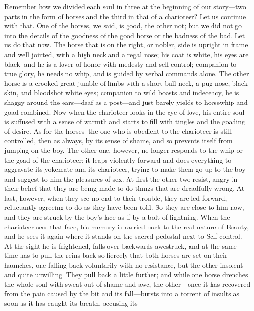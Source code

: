 Remember how we divided each soul in three at the beginning of our 
story---two parts in the form of horses and the third in that of
a charioteer? Let us continue with that. One of the horses, we said, is
good, the other not; but we did not go into the details of the goodness
of the good horse or the badness of the bad. Let us do that now. The
horse that is on the right, or nobler, side is upright in frame and well
jointed, with a high neck and a regal nose; his coat is white, his eyes
are black, and he is a lover of honor with modesty and self-control;
companion to true glory, he needs no whip, and is guided by verbal
commands alone. The other horse is a crooked great jumble of
limbs with a short bull-neck, a pug nose, black skin, and bloodshot
white eyes; companion to wild boasts and indecency, he is shaggy around
the ears---deaf as a post---and just barely yields to horsewhip and goad
combined. Now when the charioteer looks in the eye of love, his entire
soul is suffused with a sense of warmth and starts to fill with tingles
and the goading of desire. As for the horses, the one who is obedient to
the charioteer is still controlled, then as always, by its sense 
of shame, and so prevents itself from jumping on the
boy. The other one, however, no longer responds to the whip or the goad
of the charioteer; it leaps violently forward and does everything to
aggravate its yokemate and its charioteer, trying to make them go up to
the boy and suggest to him the pleasures of sex. At first the other two
resist, angry in their belief that they are being made to do
things that are dreadfully wrong. At last, however, when they see no end
to their trouble, they are led forward, reluctantly agreeing to do as
they have been told. So they are close to him now, and they are struck
by the boy’s face as if by a bolt of lightning. When the charioteer sees
that face, his memory is carried back to the real nature of Beauty, and
he sees it again where it stands on the sacred pedestal next to
Self-control. At the sight he is frightened, falls over backwards
awestruck, and at the same time has to pull the reins back so fiercely
that both horses are set on their haunches, one falling back
voluntarily with no resistance, but the other insolent and quite
unwilling. They pull back a little further; and while one horse drenches
the whole soul with sweat out of shame and awe, the other---once it has
recovered from the pain caused by the bit and its fall---bursts into a
torrent of insults as soon as it has caught its breath, accusing its
